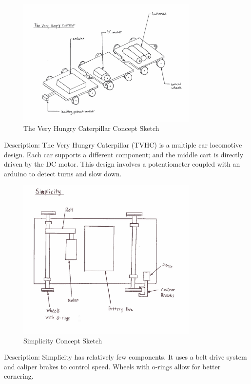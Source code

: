 \documentclass[class=../report, crop=false]{standalone}
\begin{document}
\begin{figure}[H]
	\centering
	\includegraphics[width=0.8\textwidth]{../../res/img/tvhc}
	\caption{The Very Hungry Caterpillar Concept Sketch}
	\label{app/fig:tvhc}
\end{figure}

Description: The Very Hungry Caterpillar (TVHC) is a multiple car locomotive design.
Each car supports a different component; and the middle cart is directly driven by the DC motor.
This design involves a potentiometer coupled with an arduino to detect turns and slow down.
\clearpage

\begin{figure}[H]
	\centering
	\includegraphics[width=0.8\textwidth]{../../res/img/simplicity}
	\caption{Simplicity Concept Sketch}
	\label{app/fig:simplicity}
\end{figure}

Description: Simplicity has relatively few components.
It uses a belt drive system and caliper brakes to control speed.
Wheels with o-rings allow for better cornering.
\clearpage
\end{document}
